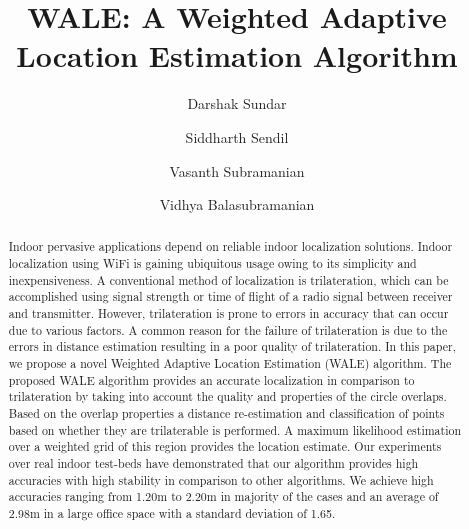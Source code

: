 \documentclass[twocolumn]{svjour3}
\begin{document}

\title{WALE: A Weighted Adaptive Location Estimation Algorithm}
\author{Darshak Sundar \and Siddharth Sendil \and Vasanth Subramanian \and Vidhya Balasubramanian }



\maketitle

\begin{abstract}
Indoor pervasive applications depend on reliable indoor localization solutions. Indoor localization using WiFi is gaining ubiquitous usage owing to its simplicity and inexpensiveness. A conventional method of localization is trilateration, which can be accomplished using signal strength or time of flight of a radio signal between receiver and transmitter. However, trilateration is prone to errors in accuracy that can occur due to various factors. A common reason for the failure of trilateration is due to the errors in distance estimation resulting in a poor quality of trilateration. In this paper, we propose a novel Weighted Adaptive Location Estimation (WALE) algorithm. The proposed WALE algorithm provides an accurate localization in comparison to trilateration by taking into account the quality and properties of the circle overlaps. Based on the overlap properties a distance re-estimation and classification of points based on whether they are trilaterable is performed. A maximum likelihood estimation over a weighted grid of this region provides the location estimate. Our experiments over real indoor test-beds have demonstrated that our algorithm provides high accuracies with high stability in comparison to other algorithms. We achieve high accuracies ranging from 1.20m to 2.20m in majority of the cases and an average of 2.98m in a large office space with a standard deviation of 1.65.


\end{abstract}
\end{document}
